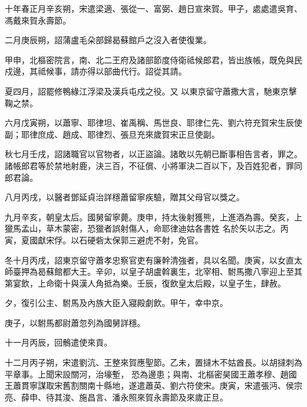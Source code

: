 
\begin{pinyinscope}

 十年春正月辛亥朔，宋遣梁適、張從一、富弼、趙日宣來賀。甲子，處處遣吳育、馮戴來賀永壽節。



 二月庚辰朔，詔蒲盧毛朵部歸曷蘇館戶之沒入者使復業。



 甲申，北樞密院言，南、北二王府及諸部節度侍衛祗候郎君，皆出族帳，既免與民戍邊，其祗候事，請亦得以部曲代行。詔從其請。



 夏四月，詔罷修鴨綠江浮梁及漢兵屯戍之役。又
 以東京留守蕭撒大言，馳東京擊鞠之禁。



 六月戊寅朔，以蕭寧、耶律坦、崔禹稱、馬世良、耶律仁先、劉六符充賀宋生辰使副；耶律庶成、趙成、耶律烈、張旦充來歲賀宋正旦使副。



 秋七月壬戌，詔諸職官以官物者，以正盜論。諸敢以先朝已斷事相告言者，罪之。諸帳郎君等於禁地射鹿，決三百，不征償、小將軍決二百以下，及百姓犯者，罪同郎君論。



 八月丙戌，以醫者鄧延貞治詳穩蕭留寧疾驗，贈其父母官以獎之。



 九月辛亥，朝皇太后。國舅留寧薨。庚申，持太後射獲熊，上進酒為壽。癸亥，上獵馬孟山，草木蒙密，恐獵者誤射傷人，命耶律迪姑各書姓
 名於矢以志之。丙寅，夏國獻宋俘。以石硬砦太保郭三避虎不射，免官。



 冬十月丙戌，詔東京留守蕭孝忠察官吏有廉幹清強者，具以名聞。庚寅，以女直太師臺押為曷蘇館都大王。辛卯，以皇子胡盧斡裏生，北宰相、駙馬撒八寧迎上至其第宴飲，上命衛十與漢人角抵為樂。壬辰，復飲皇太后殿，以皇子生，肆赦。



 夕，復引公主、駙馬及內族大臣入寢殿劇飲。甲午，幸中京。



 庚子，以駙馬都尉蕭忽列為國舅詳穩。



 十一月丙辰，回鶻遣使來貢。



 十二月丙子朔，宋遣劉沆、王整來賀應聖節。乙未，置撻木不姑酋長。以胡撻刺為平章事。上聞宋設關河，治壕塹，
 恐為邊患；與南、北樞密昊國王蕭孝穆、趙國王蕭貫寧謀取宋舊割關南十縣地，遂遣蕭英、劉六符使宋。庚寅，宋遣張沔、侯宗亮、薛申、待其浚、施昌言、潘永照來賀永壽節及來歲正旦。




\end{pinyinscope}
